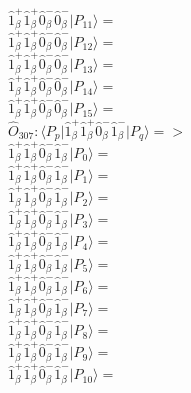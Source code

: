 \documentclass[14pt]{article}
\begin{document}
    $ \hat{1}_{\beta}^{+}\hat{1}_{\beta}^{+}\hat{0}_{\beta}^{-}\hat{0}_{\beta}^{-} \vert{P_{11}}\rangle =  $ \\ 
    $ \hat{1}_{\beta}^{+}\hat{1}_{\beta}^{+}\hat{0}_{\beta}^{-}\hat{0}_{\beta}^{-} \vert{P_{12}}\rangle =  $ \\ 
    $ \hat{1}_{\beta}^{+}\hat{1}_{\beta}^{+}\hat{0}_{\beta}^{-}\hat{0}_{\beta}^{-} \vert{P_{13}}\rangle =  $ \\ 
    $ \hat{1}_{\beta}^{+}\hat{1}_{\beta}^{+}\hat{0}_{\beta}^{-}\hat{0}_{\beta}^{-} \vert{P_{14}}\rangle =  $ \\ 
    $ \hat{1}_{\beta}^{+}\hat{1}_{\beta}^{+}\hat{0}_{\beta}^{-}\hat{0}_{\beta}^{-} \vert{P_{15}}\rangle =  $ \\ 
    
    $\hat{O}_{307}:  \langle{P_p}\vert \hat{1}_{\beta}^{+}\hat{1}_{\beta}^{+}\hat{0}_{\beta}^{-}\hat{1}_{\beta}^{-} \vert{P_q}\rangle => $ \\ 
    $ \hat{1}_{\beta}^{+}\hat{1}_{\beta}^{+}\hat{0}_{\beta}^{-}\hat{1}_{\beta}^{-} \vert{P_{0}}\rangle =  $ \\ 
    $ \hat{1}_{\beta}^{+}\hat{1}_{\beta}^{+}\hat{0}_{\beta}^{-}\hat{1}_{\beta}^{-} \vert{P_{1}}\rangle =  $ \\ 
    $ \hat{1}_{\beta}^{+}\hat{1}_{\beta}^{+}\hat{0}_{\beta}^{-}\hat{1}_{\beta}^{-} \vert{P_{2}}\rangle =  $ \\ 
    $ \hat{1}_{\beta}^{+}\hat{1}_{\beta}^{+}\hat{0}_{\beta}^{-}\hat{1}_{\beta}^{-} \vert{P_{3}}\rangle =  $ \\ 
    $ \hat{1}_{\beta}^{+}\hat{1}_{\beta}^{+}\hat{0}_{\beta}^{-}\hat{1}_{\beta}^{-} \vert{P_{4}}\rangle =  $ \\ 
    $ \hat{1}_{\beta}^{+}\hat{1}_{\beta}^{+}\hat{0}_{\beta}^{-}\hat{1}_{\beta}^{-} \vert{P_{5}}\rangle =  $ \\ 
    $ \hat{1}_{\beta}^{+}\hat{1}_{\beta}^{+}\hat{0}_{\beta}^{-}\hat{1}_{\beta}^{-} \vert{P_{6}}\rangle =  $ \\ 
    $ \hat{1}_{\beta}^{+}\hat{1}_{\beta}^{+}\hat{0}_{\beta}^{-}\hat{1}_{\beta}^{-} \vert{P_{7}}\rangle =  $ \\ 
    $ \hat{1}_{\beta}^{+}\hat{1}_{\beta}^{+}\hat{0}_{\beta}^{-}\hat{1}_{\beta}^{-} \vert{P_{8}}\rangle =  $ \\ 
    $ \hat{1}_{\beta}^{+}\hat{1}_{\beta}^{+}\hat{0}_{\beta}^{-}\hat{1}_{\beta}^{-} \vert{P_{9}}\rangle =  $ \\ 
    $ \hat{1}_{\beta}^{+}\hat{1}_{\beta}^{+}\hat{0}_{\beta}^{-}\hat{1}_{\beta}^{-} \vert{P_{10}}\rangle =  $ \\ 
\end{document}
